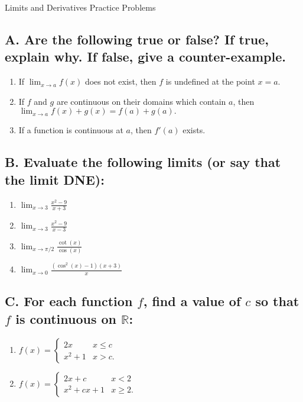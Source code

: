 \documentclass{article}
\begin{document}
\begin{center}
\begin{Huge}Limits and Derivatives Practice Problems\end{Huge}
\end{center}


\subsection*{A. Are the following true or false? If true, explain why. If false, give a counter-example.}
\begin{enumerate}
\item If $\displaystyle\lim_{x\to a} f(x)$ does not exist, then $f$ is undefined at the point $x=a$.
\item If $f$ and $g$ are continuous on their domains which contain $a$, then $\displaystyle\lim_{x\to a} f(x) + g(x) = f(a) + g(a).$
\item If a function is continuous at $a$, then $f'(a)$ exists.
\end{enumerate}


\subsection*{B. Evaluate the following limits (or say that the limit DNE):}

\begin{enumerate}
\item $\displaystyle\lim_{x\to 3}\frac{x^2-9}{x+3}$
\item $\displaystyle\lim_{x\to 3}\frac{x^2-9
   }{x-3}$
\item $\displaystyle\lim_{x\to \pi/2}\frac{\cot(x)}{\cos(x)}$
\item $\displaystyle\lim_{x\to 0}\frac{(\cos^2(x) - 1)(x+3)}{x}$
\end{enumerate}

\subsection*{C. For each function $f$, find a value of $c$ so that $f$ is continuous on $\mathbb{R}$:}

\begin{enumerate}
\item $f(x)=\begin{cases}2x & x \leq c \\ x^2+1 & x > c.\end{cases}$
\item $f(x)=\begin{cases}2x+c & x < 2 \\ x^2 + cx +1 & x \geq 2.\end{cases}$
\end{enumerate}
\end{document}
